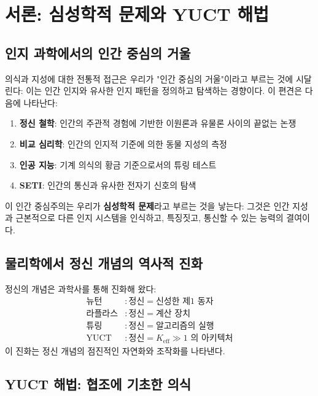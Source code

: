 \documentclass[11pt,a4paper]{article}
\newcommand{\eff}{\mathrm{eff}}
\newcommand{\Ke}{K_{\eff}}
\begin{document}
	\tableofcontents
	
	\newpage
	
	\section{서론: 심성학적 문제와 YUCT 해법}
	
	\subsection{인지 과학에서의 인간 중심의 거울}
	
	의식과 지성에 대한 전통적 접근은 우리가 "인간 중심의 거울"이라고 부르는 것에 시달린다: 이는 인간 인지와 유사한 인지 패턴을 정의하고 탐색하는 경향이다. 이 편견은 다음에 나타난다:
	\begin{enumerate}
		\item \textbf{정신 철학}: 인간의 주관적 경험에 기반한 이원론과 유물론 사이의 끝없는 논쟁
		\item \textbf{비교 심리학}: 인간의 인지적 기준에 의한 동물 지성의 측정
		\item \textbf{인공 지능}: 기계 의식의 황금 기준으로서의 튜링 테스트
		\item \textbf{SETI}: 인간의 통신과 유사한 전자기 신호의 탐색
	\end{enumerate}
	이 인간 중심주의는 우리가 \textbf{심성학적 문제}라고 부르는 것을 낳는다: 그것은 인간 지성과 근본적으로 다른 인지 시스템을 인식하고, 특징짓고, 통신할 수 있는 능력의 결여이다.
	
	\subsection{물리학에서 정신 개념의 역사적 진화}
	
	정신의 개념은 과학사를 통해 진화해 왔다:
	\[
	\begin{aligned}
		\text{뉴턴} &: \text{정신} = \text{신성한 제1 동자} \\
		\text{라플라스} &: \text{정신} = \text{계산 장치} \\
		\text{튜링} &: \text{정신} = \text{알고리즘의 실행} \\
		\text{YUCT} &: \text{정신} = \Ke \gg 1 \text{ 의 아키텍처}
	\end{aligned}
	\]
	이 진화는 정신 개념의 점진적인 자연화와 조작화를 나타낸다.
	
	\subsection{YUCT 해법: 협조에 기초한 의식}
	
\end{document}
